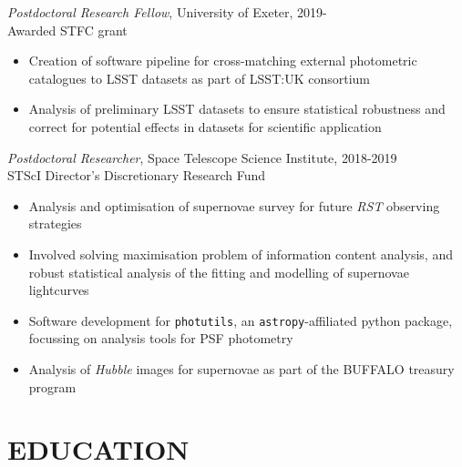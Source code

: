 \documentclass[letter, margin, 10pt]{res} %
\begin{document}
\begin{resume}
{\sl Postdoctoral Research Fellow}, University of Exeter, 2019-\\
\null\quad\quad Awarded STFC grant
\begin{itemize}[noitemsep,topsep=0pt,parsep=0pt,partopsep=0pt]
\item Creation of software pipeline for cross-matching external photometric catalogues to LSST datasets as part of LSST:UK consortium
\item Analysis of preliminary LSST datasets to ensure statistical robustness and correct for potential effects in datasets for scientific application
\end{itemize}
\vspace{-10pt}
{\sl Postdoctoral Researcher}, Space Telescope Science Institute, 2018-2019\\
\null\quad\quad STScI Director's Discretionary Research Fund
\begin{itemize}[noitemsep,topsep=0pt,parsep=0pt,partopsep=0pt]
\item Analysis and optimisation of supernovae survey for future \textit{RST} observing strategies
\item Involved solving maximisation problem of information content analysis, and robust statistical analysis of the fitting and modelling of supernovae lightcurves
\item Software development for \texttt{photutils}, an \texttt{astropy}-affiliated python package, focussing on analysis tools for PSF photometry
\item Analysis of \textit{Hubble} images for supernovae as part of the BUFFALO treasury program
\end{itemize}
\vspace{-5pt}
\section{EDUCATION}


\end{resume}
\end{document}
